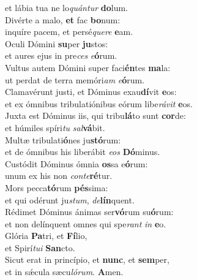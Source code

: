 \oddverse et lábia tua ne lo\textit{quán}\textit{tur} \textbf{do}lum.\\
\evenverse Divérte a malo, \textbf{et} fac \textbf{bo}num:~\*\\
\evenverse inquíre pacem, et persé\textit{que}\textit{re} \textbf{e}am.\\
\oddverse Oculi Dómini \textbf{su}per \textbf{ju}stos:~\*\\
\oddverse et aures ejus in pre\textit{ces} \textit{e}\textbf{ó}rum.\\
\evenverse Vultus autem Dómini super faci\textbf{én}tes \textbf{ma}la:~\*\\
\evenverse ut perdat de terra memóri\textit{am} \textit{e}\textbf{ó}rum.\\
\oddverse Clamavérunt justi, et Dóminus exau\textbf{dí}vit \textbf{e}os:~\*\\
\oddverse et ex ómnibus tribulatiónibus eórum libe\textit{rá}\textit{vit} \textbf{e}os.\\
\evenverse Juxta est Dóminus iis, qui tribu\textbf{lá}to sunt \textbf{cor}de:~\*\\
\evenverse et húmiles spíri\textit{tu} \textit{sal}\textbf{vá}bit.\\
\oddverse Multæ tribulati\textbf{ó}nes ju\textbf{stó}rum:~\*\\
\oddverse et de ómnibus his liberábit \textit{e}\textit{os} \textbf{Dó}minus.\\
\evenverse Custódit Dóminus ómnia \textbf{os}sa e\textbf{ó}rum:~\*\\
\evenverse unum ex his non \textit{con}\textit{te}\textbf{ré}tur.\\
\oddverse Mors pecca\textbf{tó}rum \textbf{pés}sima:~\*\\
\oddverse et qui odérunt ju\textit{stum}, \textit{de}\textbf{lín}quent.\\
\evenverse Rédimet Dóminus ánimas ser\textbf{vó}rum su\textbf{ó}rum:~\*\\
\evenverse et non delínquent omnes qui spe\textit{rant} \textit{in} \textbf{e}o.\\
\oddverse Glória \textbf{Pa}tri, et \textbf{Fí}lio,~\*\\
\oddverse et Spirí\textit{tu}\textit{i} \textbf{San}cto.\\
\evenverse Sicut erat in princípio, et \textbf{nunc}, et \textbf{sem}per,~\*\\
\evenverse et in sǽcula sæcu\textit{ló}\textit{rum}. \textbf{A}men.\\
